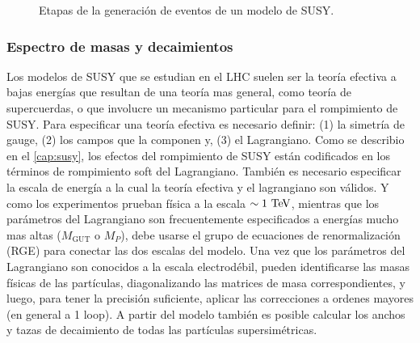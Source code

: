 \begin{figure}[h]
  \centering
  \scalebox{0.8}{}
  \caption{Etapas de la generación de eventos de un modelo de SUSY.}
  \label{fig:mc_sketch}
\end{figure}






\subsubsection{Espectro de masas y decaimientos}

Los modelos de SUSY que se estudian en el LHC suelen ser la teoría efectiva a
bajas energías que resultan de una teoría mas general, como teoría de
supercuerdas, o que involucre un mecanismo particular para el rompimiento de
SUSY. Para especificar una teoría efectiva es necesario definir: (1) la simetría
de gauge, (2) los campos que la componen y, (3) el Lagrangiano. Como se describio
en el \cref{cap:susy}, los efectos del
rompimiento de SUSY están codificados en los términos de rompimiento soft del
Lagrangiano.
También es necesario especificar la escala de energía a la cual la
teoría efectiva y el lagrangiano son válidos. Y como los experimentos prueban
física a la escala $\sim 1 \tev$, mientras que los parámetros del
Lagrangiano son frecuentemente especificados a energías mucho mas altas
($M_\text{GUT}$ o $M_P$), debe usarse el grupo de ecuaciones de renormalización
(RGE) para conectar las dos escalas del modelo. Una vez que los parámetros del
Lagrangiano son conocidos a la escala electrodébil, pueden identificarse las
masas físicas de las partículas, diagonalizando las matrices de masa
correspondientes, y luego, para tener la precisión suficiente, aplicar las
correcciones a ordenes mayores (en general a 1 loop). A partir del modelo
también es posible calcular los anchos y tazas de decaimiento de todas las
partículas supersimétricas.

